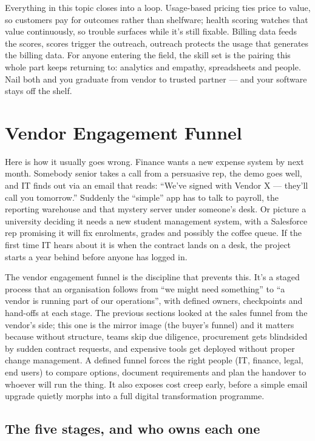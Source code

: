 Everything in this topic closes into a loop. Usage-based pricing ties price to value, so customers pay for outcomes rather than shelfware; health scoring watches that value continuously, so trouble surfaces while it's still fixable. Billing data feeds the scores, scores trigger the outreach, outreach protects the usage that generates the billing data. For anyone entering the field, the skill set is the pairing this whole part keeps returning to: analytics and empathy, spreadsheets and people. Nail both and you graduate from vendor to trusted partner — and your software stays off the shelf.

\section{Vendor Engagement Funnel}
Here is how it usually goes wrong. Finance wants a new expense system by next month. Somebody senior takes a call from a persuasive rep, the demo goes well, and IT finds out via an email that reads: ``We've signed with Vendor X — they'll call you tomorrow.'' Suddenly the ``simple'' app has to talk to payroll, the reporting warehouse and that mystery server under someone's desk. Or picture a university deciding it needs a new student management system, with a Salesforce rep promising it will fix enrolments, grades and possibly the coffee queue. If the first time IT hears about it is when the contract lands on a desk, the project starts a year behind before anyone has logged in.


The vendor engagement funnel is the discipline that prevents this. It's a staged process that an organisation follows from ``we might need something'' to ``a vendor is running part of our operations'', with defined owners, checkpoints and hand-offs at each stage. The previous sections looked at the sales funnel from the vendor's side; this one is the mirror image (the buyer's funnel) and it matters because without structure, teams skip due diligence, procurement gets blindsided by sudden contract requests, and expensive tools get deployed without proper change management. A defined funnel forces the right people (IT, finance, legal, end users) to compare options, document requirements and plan the handover to whoever will run the thing. It also exposes cost creep early, before a simple email upgrade quietly morphs into a full digital transformation programme.



\subsection{The five stages, and who owns each one}


